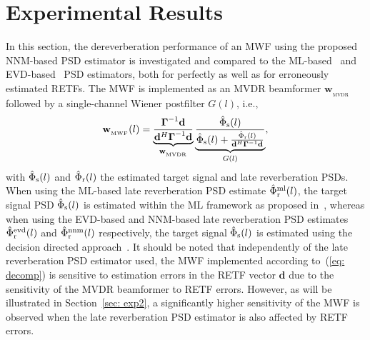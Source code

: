 \documentclass{article}
\begin{document}
\section{Experimental Results}
\label{sec: exp}
In this section, the dereverberation performance of an MWF using the proposed NNM-based PSD estimator is investigated and compared to the ML-based~\cite{Kuklasinski_EUSIPCO_2014g} and EVD-based~\cite{Kodrasi_ICASSP_2017} PSD estimators, both for perfectly as well as for erroneously estimated RETFs.
The MWF is implemented as an MVDR beamformer ${\mathbf{w}_{_{\text{MVDR}}}}$ followed by a single-channel Wiener postfilter $G(l)$, i.e.,
\begin{equation}
\label{eq: decomp}
\mathbf{w}_{_{\text{MWF}}}(l) = \underbrace{\frac{\boldsymbol{{\Gamma}}^{-1}\mathbf{d}}{\mathbf{d}^H\boldsymbol{{\Gamma}}^{-1}\mathbf{d}}}_{\mathbf{w}_{_{\text{MVDR}}}} \underbrace{\frac{\hat{\Phi}_{\rm s}(l)}{\hat{\Phi}_{\rm s}(l) + \frac{\hat{\Phi}_{\rm r}(l)}{\mathbf{d}^H\boldsymbol{\Gamma}^{-1}\mathbf{d}}}}_{G(l)},
\end{equation}
with $\hat{\Phi}_{\rm s}(l)$ and $\hat{\Phi}_{\rm r}(l)$ the estimated target signal and late reverberation PSDs.
When using the ML-based late reverberation PSD estimate $\hat{\Phi}^{\rm ml}_{\rm r}(l)$, the target signal PSD $\hat{\Phi}_{\rm s}(l)$ is estimated within the ML framework as proposed in~\cite{Kuklasinski_EUSIPCO_2014g}, whereas when using the EVD-based and NNM-based late reverberation PSD estimates $\hat{\Phi}^{\rm evd}_{\rm r}(l)$ and $\hat{\Phi}^{\rm nnm}_{\rm r}(l)$ respectively, the target signal $\hat{\Phi}_{\rm s}(l)$ is estimated using the decision directed approach~\cite{Ephraim_ITASSP_1984}.
It should be noted that independently of the late reverberation PSD estimator used, the MWF implemented according to~(\ref{eq: decomp}) is sensitive to estimation errors in the RETF vector $\mathbf{d}$ due to the sensitivity of the MVDR beamformer to RETF errors.
However, as will be illustrated in Section~\ref{sec: exp2}, a significantly higher sensitivity of the MWF is observed when the late reverberation PSD estimator is also affected by RETF errors.
\end{document}
